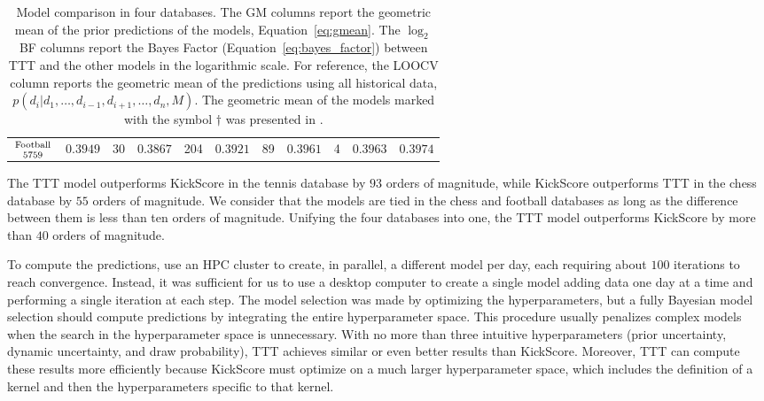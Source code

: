 \documentclass[article]{jss}
\newcommand\hfrac[2]{\genfrac{}{}{0pt}{}{#1}{#2}} %
\begin{document}
\begin{table}[ht!]
\begin{tabular}{c|cc|cc|cc|cc|c||c}
  \multirow{2}{*}{$\hfrac{\text{\scriptsize Football}}{\num{5759}}$} & \multirow{2}{*}{$0.3949$} & \multirow{2}{*}{\num{30}} & \multirow{2}{*}{$0.3867$} & \multirow{2}{*}{\num{204}} & \multirow{2}{*}{$0.3921$} & \multirow{2}{*}{\num{89}} & \multirow{2}{*}{$\bm{0.3961}$} & \multirow{2}{*}{\num{4}} & \multirow{2}{*}{$\bm{0.3963}$} &  \multirow{2}{*}{${0.3974}$} \\
    & & & & & & & & & & \\ \hline
\end{tabular}
\caption{
Model comparison in four databases.
The GM columns report the geometric mean of the prior predictions of the models, Equation~\ref{eq:gmean}.
The $\log_2$BF columns report the Bayes Factor (Equation~\ref{eq:bayes_factor}) between TTT and the other models in the logarithmic scale.
For reference, the LOOCV column reports the geometric mean of the predictions using all historical data, $p(d_i| d_1, \dots, d_{i-1}, d_{i+1}, \dots, d_n, M)$.
The geometric mean of the models marked with the symbol $\dagger$ was presented in \cite{Maystre2019}.
}
\label{Tab:Models}
\end{table}
The TTT model outperforms KickScore in the tennis database by $93$ orders of magnitude, while KickScore outperforms TTT in the chess database by $55$ orders of magnitude.
We consider that the models are tied in the chess and football databases as long as the difference between them is less than ten orders of magnitude.
Unifying the four databases into one, the TTT model outperforms KickScore by more than $40$ orders of magnitude.


To compute the predictions, \cite{Maystre2019} use an HPC cluster to create, in parallel, a different model per day, each requiring about $100$ iterations to reach convergence.
Instead, it was sufficient for us to use a desktop computer to create a single model adding data one day at a time and performing a single iteration at each step.
The model selection was made by optimizing the hyperparameters, but a fully Bayesian model selection should compute predictions by integrating the entire hyperparameter space.
This procedure usually penalizes complex models when the search in the hyperparameter space is unnecessary.
With no more than three intuitive hyperparameters (prior uncertainty, dynamic uncertainty, and draw probability), TTT achieves similar or even better results than KickScore. Moreover, TTT can compute these results more efficiently because KickScore must optimize on a much larger hyperparameter space, which includes the definition of a kernel and then the hyperparameters specific to that kernel.
\end{document}
